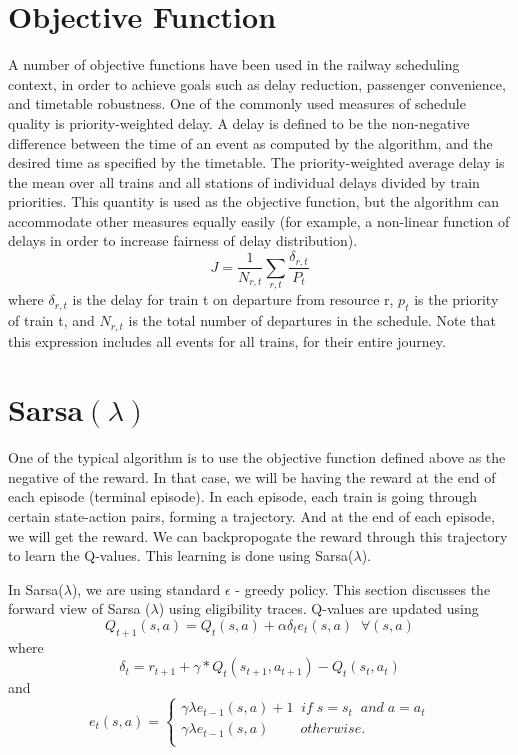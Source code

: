 \section{Objective Function}
A number of objective functions have been used in the
railway scheduling context, in order to achieve goals such
as delay reduction, passenger convenience, and timetable
robustness. One of the commonly used measures of
schedule quality is priority-weighted delay. A delay is
defined to be the non-negative difference between the time
of an event as computed by the algorithm, and the desired
time as specified by the timetable. The priority-weighted
average delay is the mean over all trains and all stations
of individual delays divided by train priorities. This quantity
is used as the objective function, but the algorithm can
accommodate other measures equally easily (for example,
a non-linear function of delays in order to increase fairness
of delay distribution).
$$ J = \frac{1}{N_{r,t}} \sum_{r,t} \frac{\delta_{r,t}}{P_t} $$
where $\delta_{r,t}$ is the delay for train t on departure from resource r,
$p_t$ is the priority of train t, and $N_{r,t}$ is the total number of
departures in the schedule. Note that this expression includes
all events for all trains, for their entire journey.

\section{Sarsa$(\lambda)$}
One of the typical algorithm is to use the objective function defined above as the negative of the reward. 
In that case, we will be having the reward at the end of each episode (terminal episode).
In each episode, each train is going through certain state-action pairs, forming a trajectory. And at the end
of each episode, we will get the reward. We can backpropogate the reward through this trajectory to learn
the Q-values. This learning is done using Sarsa($\lambda$).

\vspace{\baselineskip}
In Sarsa($\lambda$), we are using standard $\epsilon$ - greedy policy. This section discusses the forward view of 
Sarsa ($\lambda$) using eligibility traces. Q-values are updated using 
$$ Q_{t+1}(s,a) = Q_t(s,a) + \alpha\delta_te_t(s,a)  \;\; \forall(s,a)$$ 
where 
$$\delta_t = r_{t+1} + \gamma*Q_t(s_{t+1} , a_{t+1}) - Q_t(s_t ,a_t)$$
and 
\[
    e_t(s,a)=\left\{
                \begin{array}{ll}
                  \gamma\lambda e_{t-1}(s,a) + 1 \;\; if \; s=s_t \;\; and \; a=a_t\\
                  \gamma\lambda e_{t-1}(s,a) \;\;\;\;\;\;\;\; otherwise.\\
                \end{array}
              \right.
\]

